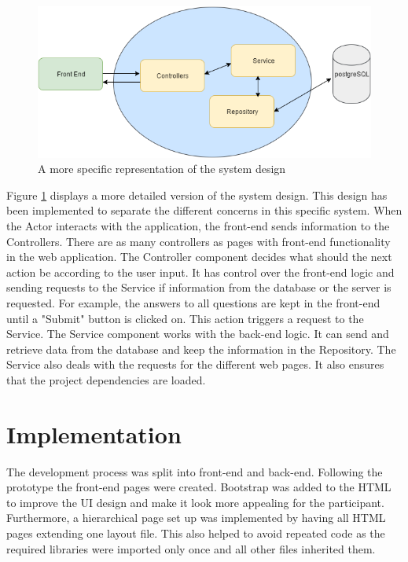 \documentclass{l4proj}
\begin{document}
\begin{figure}[H]
\centering
\includegraphics[width=12cm]{moreSpecificDesign.png}
\caption{A more specific representation of the system design}
\label{moreSpecificDesign}
\end{figure}

Figure \ref{moreSpecificDesign} displays a more detailed version of the system design. This design has been implemented to separate the different concerns in this specific system. When the Actor interacts with the application, the front-end sends information to the Controllers. There are as many controllers as pages with front-end functionality in the web application. The Controller component decides what should the next action be according to the user input. It has control over the front-end logic and sending requests to the Service if information from the database or the server is requested. For example, the answers to all questions are kept in the front-end until a "Submit" button is clicked on. This action triggers a request to the Service. The Service component works with the back-end logic. It can send and retrieve data from the database and keep the information in the Repository. The Service also deals with the requests for the different web pages. It also ensures that the project dependencies are loaded.   




\section{Implementation}

The development process was split into front-end and back-end. Following the prototype the front-end pages were created. Bootstrap was added to the HTML to improve the UI design and make it look more appealing for the participant. Furthermore, a hierarchical page set up was implemented by having all HTML pages extending one layout file. This also helped to avoid repeated code as the required libraries were imported only once and all other files inherited them. 
\end{document}
